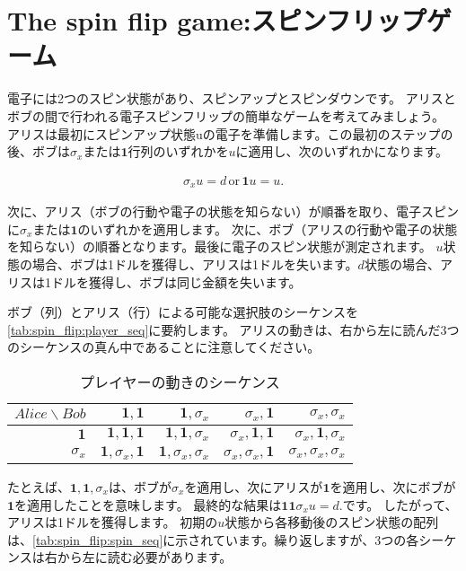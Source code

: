 \section{The spin flip game:スピンフリップゲーム}
\label{sec:the_spin_flip_game}

電子には2つのスピン状態があり、スピンアップとスピンダウンです。
アリスとボブの間で行われる電子スピンフリップの簡単なゲームを考えてみましょう。
アリスは最初にスピンアップ状態uの電子を準備します。この最初のステップの後、ボブは$\sigma_x$または$\mathbf{1}$行列のいずれかを$u$に適用し、次のいずれかになります。

\begin{align}
\sigma_x u = d \, \text{or} \, \mathbf{1}u = u.
\end{align}

次に、アリス（ボブの行動や電子の状態を知らない）が順番を取り、電子スピンに$\sigma_x$または$\mathbf{1}$のいずれかを適用します。
次に、ボブ（アリスの行動や電子の状態を知らない）の順番となります。最後に電子のスピン状態が測定されます。
$u$状態の場合、ボブは1ドルを獲得し、アリスは1ドルを失います。$d$状態の場合、アリスは1ドルを獲得し、ボブは同じ金額を失います。

ボブ（列）とアリス（行）による可能な選択肢のシーケンスを\autoref{tab:spin_flip:player_seq}に要約します。
アリスの動きは、右から左に読んだ3つのシーケンスの真ん中であることに注意してください。

\begin{table}[H]
\caption{プレイヤーの動きのシーケンス}
\label{tab:spin_flip:player_seq}
\centering
  \begin{tabular}{|r||r|r|r|r|} \hline
    $Alice \backslash Bob$ & $\mathbf{1}, \mathbf{1}$  &  $\mathbf{1}, \sigma_x $  & $ \sigma_x,\mathbf{1} $ & $\sigma_x, \sigma_x $  \\ \hline \hline
    $\mathbf{1}$ & $\mathbf{1}, \mathbf{1},\mathbf{1}$ & $\mathbf{1}, \mathbf{1},\sigma_x$ & $\sigma_x, \mathbf{1},\mathbf{1}$ & $\sigma_x, \mathbf{1},\sigma_x$ \\
    $\sigma_x$ & $\mathbf{1}, \sigma_x,\mathbf{1}$ & $ \mathbf{1}, \sigma_x,\sigma_x$ & $\sigma_x, \sigma_x,\mathbf{1}$ & $\sigma_x, \sigma_x,\sigma_x$\\ \hline
  \end{tabular}
\end{table}

たとえば、$\mathbf{1},\mathbf{1}, \sigma_x$は、ボブが$\sigma_x$を適用し、次にアリスが$\mathbf{1}$を適用し、次にボブが$\mathbf{1}$を適用したことを意味します。
最終的な結果は$\mathbf{11} \sigma_x u = d.$です。
したがって、アリスは1ドルを獲得します。
初期の$u$状態から各移動後のスピン状態の配列は、\autoref{tab:spin_flip:spin_seq}に示されています。繰り返しますが、3つの各シーケンスは右から左に読む必要があります。

